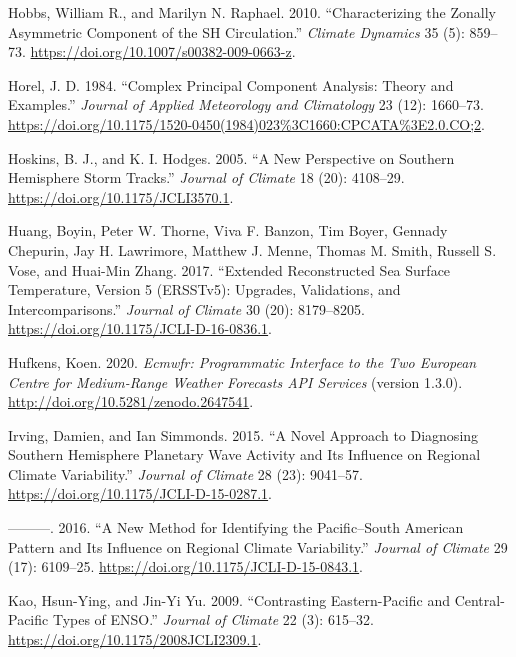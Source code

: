 \documentclass[smallextended]{svjour3}       %
\newlength{\cslhangindent}
\newlength{\cslentryspacingunit} %
\newenvironment{CSLReferences}[2] %
 {%
  \setlength{\parindent}{0pt}
  \ifodd #1
  \let\oldpar\par
  \def\par{\hangindent=\cslhangindent\oldpar}
  \fi
  \setlength{\parskip}{#2\cslentryspacingunit}
 }%
 {}
\begin{document}
\begin{CSLReferences}{1}{0}
\leavevmode{}%
Hobbs, William R., and Marilyn N. Raphael. 2010. {``Characterizing the Zonally Asymmetric Component of the {SH} Circulation.''} \emph{Climate Dynamics} 35 (5): 859--73. \url{https://doi.org/10.1007/s00382-009-0663-z}.

\leavevmode{}%
Horel, J. D. 1984. {``Complex {Principal Component Analysis}: {Theory} and {Examples}.''} \emph{Journal of Applied Meteorology and Climatology} 23 (12): 1660--73. \url{https://doi.org/10.1175/1520-0450(1984)023\%3C1660:CPCATA\%3E2.0.CO;2}.

\leavevmode{}%
Hoskins, B. J., and K. I. Hodges. 2005. {``A {New Perspective} on {Southern Hemisphere Storm Tracks}.''} \emph{Journal of Climate} 18 (20): 4108--29. \url{https://doi.org/10.1175/JCLI3570.1}.

\leavevmode{}%
Huang, Boyin, Peter W. Thorne, Viva F. Banzon, Tim Boyer, Gennady Chepurin, Jay H. Lawrimore, Matthew J. Menne, Thomas M. Smith, Russell S. Vose, and Huai-Min Zhang. 2017. {``Extended {Reconstructed Sea Surface Temperature}, {Version} 5 ({ERSSTv5}): {Upgrades}, {Validations}, and {Intercomparisons}.''} \emph{Journal of Climate} 30 (20): 8179--8205. \url{https://doi.org/10.1175/JCLI-D-16-0836.1}.

\leavevmode{}%
Hufkens, Koen. 2020. \emph{Ecmwfr: {Programmatic} Interface to the Two {European Centre} for {Medium-Range Weather Forecasts API} Services} (version 1.3.0). \url{http://doi.org/10.5281/zenodo.2647541}.

\leavevmode{}%
Irving, Damien, and Ian Simmonds. 2015. {``A {Novel Approach} to {Diagnosing Southern Hemisphere Planetary Wave Activity} and {Its Influence} on {Regional Climate Variability}.''} \emph{Journal of Climate} 28 (23): 9041--57. \url{https://doi.org/10.1175/JCLI-D-15-0287.1}.

\leavevmode{}%
---------. 2016. {``A {New Method} for {Identifying} the {Pacific}--{South American Pattern} and {Its Influence} on {Regional Climate Variability}.''} \emph{Journal of Climate} 29 (17): 6109--25. \url{https://doi.org/10.1175/JCLI-D-15-0843.1}.

\leavevmode{}%
Kao, Hsun-Ying, and Jin-Yi Yu. 2009. {``Contrasting {Eastern-Pacific} and {Central-Pacific Types} of {ENSO}.''} \emph{Journal of Climate} 22 (3): 615--32. \url{https://doi.org/10.1175/2008JCLI2309.1}.


\end{CSLReferences}
\end{document}
